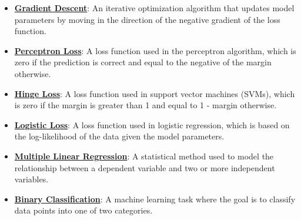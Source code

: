 \documentclass{article}%
\begin{document}
\begin{itemize}[leftmargin=*]
\item \href{https://purdue.brightspace.com/d2l/common/assets/pdfjs-d2l-dist/1.0.14-legacy/web/viewer.html?file=%2Fcontent%2Fenforced%2F1095467-wl.202510.CS.24300.001%2F05L2-ML Basics.pdf%3Fou%3D1095467&lang=en-us&container=d2l-fileviewer-rendered-pdf&fullscreen=d2l-fileviewer-rendered-pdf-dialog&height=667#page=28}{\textbf{Gradient Descent}}: An iterative optimization algorithm that updates model parameters by moving in the direction of the negative gradient of the loss function.%
\item \href{https://purdue.brightspace.com/d2l/common/assets/pdfjs-d2l-dist/1.0.14-legacy/web/viewer.html?file=%2Fcontent%2Fenforced%2F1095467-wl.202510.CS.24300.001%2F05L2-ML Basics.pdf%3Fou%3D1095467&lang=en-us&container=d2l-fileviewer-rendered-pdf&fullscreen=d2l-fileviewer-rendered-pdf-dialog&height=667#page=27}{\textbf{Perceptron Loss}}: A loss function used in the perceptron algorithm, which is zero if the prediction is correct and equal to the negative of the margin otherwise.%
\item \href{https://purdue.brightspace.com/d2l/common/assets/pdfjs-d2l-dist/1.0.14-legacy/web/viewer.html?file=%2Fcontent%2Fenforced%2F1095467-wl.202510.CS.24300.001%2F05L2-ML Basics.pdf%3Fou%3D1095467&lang=en-us&container=d2l-fileviewer-rendered-pdf&fullscreen=d2l-fileviewer-rendered-pdf-dialog&height=667#page=27}{\textbf{Hinge Loss}}: A loss function used in support vector machines (SVMs), which is zero if the margin is greater than 1 and equal to 1 - margin otherwise.%
\item \href{https://purdue.brightspace.com/d2l/common/assets/pdfjs-d2l-dist/1.0.14-legacy/web/viewer.html?file=%2Fcontent%2Fenforced%2F1095467-wl.202510.CS.24300.001%2F05L2-ML Basics.pdf%3Fou%3D1095467&lang=en-us&container=d2l-fileviewer-rendered-pdf&fullscreen=d2l-fileviewer-rendered-pdf-dialog&height=667#page=27}{\textbf{Logistic Loss}}: A loss function used in logistic regression, which is based on the log-likelihood of the data given the model parameters.%
\item \href{https://purdue.brightspace.com/d2l/common/assets/pdfjs-d2l-dist/1.0.14-legacy/web/viewer.html?file=%2Fcontent%2Fenforced%2F1095467-wl.202510.CS.24300.001%2F05L2-ML Basics.pdf%3Fou%3D1095467&lang=en-us&container=d2l-fileviewer-rendered-pdf&fullscreen=d2l-fileviewer-rendered-pdf-dialog&height=667#page=11}{\textbf{Multiple Linear Regression}}: A statistical method used to model the relationship between a dependent variable and two or more independent variables.%
\item \href{https://purdue.brightspace.com/d2l/common/assets/pdfjs-d2l-dist/1.0.14-legacy/web/viewer.html?file=%2Fcontent%2Fenforced%2F1095467-wl.202510.CS.24300.001%2F05L2-ML Basics.pdf%3Fou%3D1095467&lang=en-us&container=d2l-fileviewer-rendered-pdf&fullscreen=d2l-fileviewer-rendered-pdf-dialog&height=667#page=20}{\textbf{Binary Classification}}: A machine learning task where the goal is to classify data points into one of two categories.%

\end{itemize}
\end{document}
